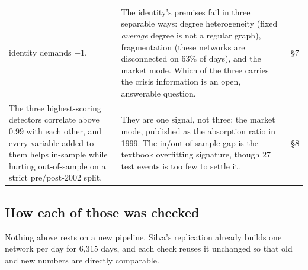 \documentclass[11pt,a4paper]{article}
\begin{document}
\begin{center}
\begin{tabular}{@{}>{\raggedright\arraybackslash}p{5.7cm}
                  >{\raggedright\arraybackslash}p{8.05cm}
                  >{\raggedright\arraybackslash}p{1.3cm}@{}}
identity demands $-1$. &
The identity's premises fail in three separable ways: degree heterogeneity
(fixed \emph{average} degree is not a regular graph), fragmentation (these
networks are disconnected on $63\%$ of days), and the market mode. Which of the
three carries the crisis information is an open, answerable question. &
\S7 \\
\addlinespace[2pt]
The three highest-scoring detectors correlate above $0.99$ with each other, and
every variable added to them helps in-sample while hurting out-of-sample on a
strict pre/post-2002 split. &
They are one signal, not three: the market mode, published as the absorption
ratio in 1999. The in/out-of-sample gap is the textbook overfitting signature,
though $27$ test events is too few to settle it. &
\S8 \\
\bottomrule
\end{tabular}
\end{center}

\subsection*{How each of those was checked}

Nothing above rests on a new pipeline. Silva's replication already builds one
network per day for 6{,}315 days, and each check reuses it unchanged so that
old and new numbers are directly comparable.
\end{document}

